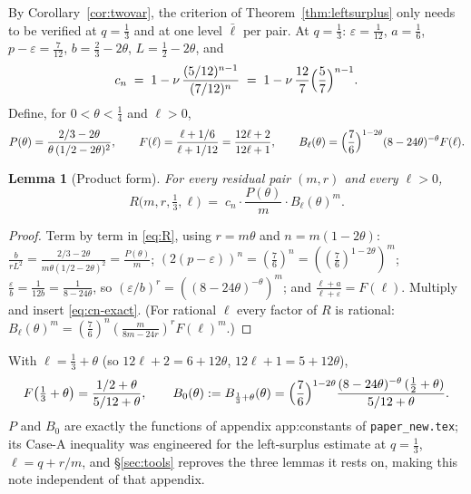 \documentclass[11pt]{article}
\newtheorem{lemma}[theorem]{Lemma}
\theoremstyle{remark}
\theoremstyle{plain}
\theoremstyle{plain}
\newcommand{\lbar}{\bar\ell}
\begin{document}
By Corollary~\ref{cor:twovar}, the criterion of Theorem~\ref{thm:leftsurplus} only needs to be verified at $q=\tfrac13$ and at one level $\lbar$ per pair.  At $q=\tfrac13$: $\varepsilon=\tfrac1{12}$, $a=\tfrac16$, $p-\varepsilon=\tfrac7{12}$, $b=\tfrac23-2\theta$, $L=\tfrac12-2\theta$, and
\begin{equation}\label{eq:cn-exact}
        c_n\;=\;1-\nu\,\frac{(5/12)^{n-1}}{(7/12)^{n}}
        \;=\;1-\nu\,\frac{12}{7}\Bigl(\frac57\Bigr)^{n-1}.
\end{equation}
Define, for $0<\theta<\tfrac14$ and $\ell>0$,
\begin{equation}\label{eq:PBF}
        P(\theta)=\frac{2/3-2\theta}{\theta\,(1/2-2\theta)^2},
        \qquad
        F(\ell)=\frac{\ell+1/6}{\ell+1/12}=\frac{12\ell+2}{12\ell+1},
        \qquad
        B_\ell(\theta)=\Bigl(\frac76\Bigr)^{1-2\theta}(8-24\theta)^{-\theta}F(\ell).
\end{equation}

\begin{lemma}[Product form]\label{lem:prod}
For every residual pair $(m,r)$ and every $\ell>0$,
\[
        R\bigl(m,r,\tfrac13,\ell\bigr)
        \;=\;c_n\cdot\frac{P(\theta)}{m}\cdot B_\ell(\theta)^m .
\]
\end{lemma}

\begin{proof}
Term by term in \eqref{eq:R}, using $r=m\theta$ and $n=m(1-2\theta)$:
$\frac{b}{rL^2}=\frac{2/3-2\theta}{m\theta(1/2-2\theta)^2}=\frac{P(\theta)}m$;
$(2(p-\varepsilon))^n=(\tfrac76)^n=((\tfrac76)^{1-2\theta})^m$;
$\frac{\varepsilon}{b}=\frac1{12b}=\frac1{8-24\theta}$, so $(\varepsilon/b)^r=((8-24\theta)^{-\theta})^m$; and
$\frac{\ell+a}{\ell+\varepsilon}=F(\ell)$.  Multiply and insert \eqref{eq:cn-exact}.  (For rational $\ell$ every factor of $R$ is rational: $B_\ell(\theta)^m=(\tfrac76)^n(\tfrac{m}{8m-24r})^rF(\ell)^m$.)
\end{proof}

With $\ell=\tfrac13+\theta$ (so $12\ell+2=6+12\theta$, $12\ell+1=5+12\theta$),
\begin{equation}\label{eq:B0}
        F\bigl(\tfrac13+\theta\bigr)=\frac{1/2+\theta}{5/12+\theta},
        \qquad
        B_0(\theta):=B_{\frac13+\theta}(\theta)
        =\Bigl(\frac76\Bigr)^{1-2\theta}\frac{(8-24\theta)^{-\theta}\,(\tfrac12+\theta)}{5/12+\theta}.
\end{equation}
$P$ and $B_0$ are exactly the functions of appendix app:constants of \texttt{paper\_new.tex}; its Case-A inequality was engineered for the left-surplus estimate at $q=\tfrac13$, $\ell=q+r/m$, and \S\ref{sec:tools} reproves the three lemmas it rests on, making this note independent of that appendix.
\end{document}
